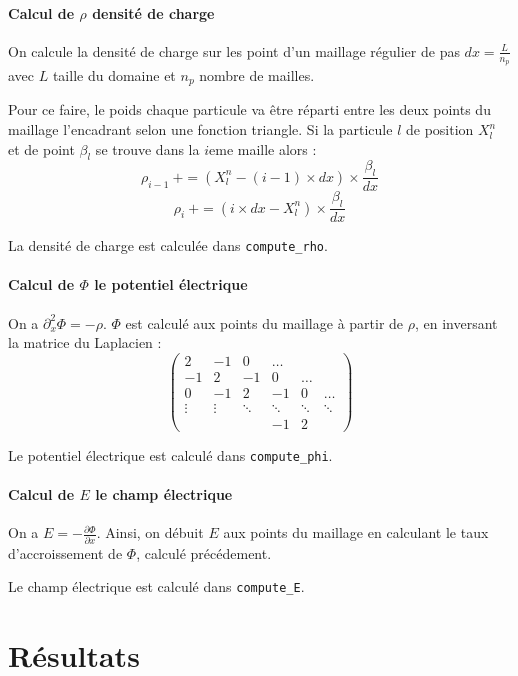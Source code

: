\documentclass[a4paper,11pt]{article}
\newcommand{\Python}[1]{\texttt{#1}}
\begin{document}
\paragraph{Calcul de $\rho$ densité de charge} 
On calcule la densité de charge sur les point d'un maillage régulier de pas $dx = \frac{L}{n_p}$ avec $L$ taille du domaine et $n_p$ nombre de mailles.

Pour ce faire, le poids chaque particule va être réparti entre les deux points du maillage l'encadrant selon une fonction triangle. Si la particule $l$ de position $X_l^n$ et de point $\beta_l$ se trouve dans la $i$eme maille alors :
$$
\rho_{i -1} \ += (X_l^n - (i-1)\times dx) \times \frac{\beta_l}{dx} $$ $$
\rho_{i}\ += (i\times dx - X_l^n) \times \frac{\beta_l}{dx} 
$$

La densité de charge est calculée dans \Python{compute_rho}.

\paragraph{Calcul de $\Phi$ le potentiel électrique}
On a $\partial_x^2 \Phi = - \rho$. $\Phi$ est calculé aux points du maillage à partir de $\rho$, en inversant la matrice du Laplacien :
$$
\left( \begin{matrix}
2 & -1 & 0 & \dots \\
-1 & 2 & -1 & 0 & \dots \\
0 & -1 & 2 & -1 & 0 & \dots \\
\vdots & \vdots & \ddots & \ddots & \ddots & \ddots \\
& & & -1 & 2
\end{matrix}
\right)
$$

Le potentiel électrique est calculé dans \Python{compute_phi}.

\paragraph{Calcul de $E$ le champ électrique}
On a $E = - \frac{\partial \Phi}{\partial x}$. Ainsi, on débuit $E$ aux points du maillage en calculant le taux d'accroissement de $\Phi$, calculé précédement. 

Le champ électrique est calculé dans \Python{compute_E}.

\section{Résultats}
\end{document}
